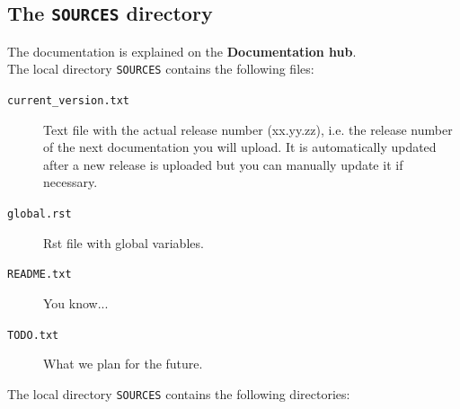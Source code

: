 \documentclass[a4paper,10pt]{article}
\newcommand{\code}[1]{\texttt{#1}}
\newcommand{\dhub}{{\bf Documentation hub}}
\begin{document}

\subsection{The \code{SOURCES} directory}
\label{doc_content}

The documentation is explained on the \dhub.\\

The local directory \code{SOURCES} contains the following files:

\begin{description}
 \item[\code{current\_version.txt}] Text file with the actual release number (xx.yy.zz), i.e. the release number of the next documentation you will upload. It is automatically updated after a new release is uploaded but you can manually update it
if necessary.
 \item[\code{global.rst}] Rst file with global variables.
 \item[\code{README.txt}] You know...
 \item[\code{TODO.txt}] What we plan for the future.
\end{description}

The local directory \code{SOURCES} contains the following directories:
\end{document}
